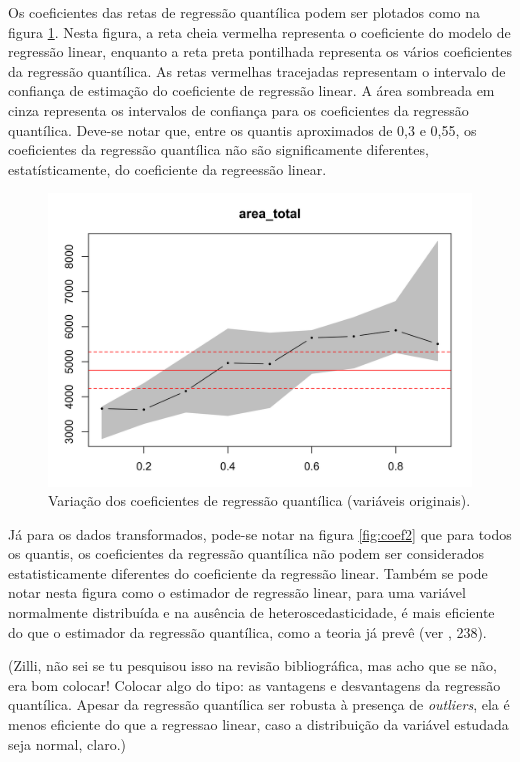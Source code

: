 \documentclass[a4paper, 12pt]{article}
\begin{document}
Os coeficientes das retas de regressão quantílica podem ser plotados
como na figura \ref{fig:coef1}. Nesta figura, a reta cheia vermelha
representa o coeficiente do modelo de regressão linear, enquanto a reta
preta pontilhada representa os vários coeficientes da regressão
quantílica. As retas vermelhas tracejadas representam o intervalo de
confiança de estimação do coeficiente de regressão linear. A área
sombreada em cinza representa os intervalos de confiança para os
coeficientes da regressão quantílica. Deve-se notar que, entre os
quantis aproximados de 0,3 e 0,55, os coeficientes da regressão
quantílica não são significamente diferentes, estatísticamente, do
coeficiente da regreessão linear.

\begin{figure}[H]

{\centering \includegraphics[width=0.7\linewidth]{images/coef1-1} 

}

\caption{Variação dos coeficientes de regressão quantílica (variáveis originais).}\label{fig:coef1}
\end{figure}

Já para os dados transformados, pode-se notar na figura \ref{fig:coef2}
que para todos os quantis, os coeficientes da regressão quantílica não
podem ser considerados estatisticamente diferentes do coeficiente da
regressão linear. Também se pode notar nesta figura como o estimador de
regressão linear, para uma variável normalmente distribuída e na
ausência de heteroscedasticidade, é mais eficiente do que o estimador da
regressão quantílica, como a teoria já prevê (ver
\textcite{matloff2017}, 238).

(Zilli, não sei se tu pesquisou isso na revisão bibliográfica, mas acho
que se não, era bom colocar! Colocar algo do tipo: as vantagens e
desvantagens da regressão quantílica. Apesar da regressão quantílica ser
robusta à presença de \emph{outliers}, ela é menos eficiente do que a
regressao linear, caso a distribuição da variável estudada seja normal,
claro.)
\end{document}
